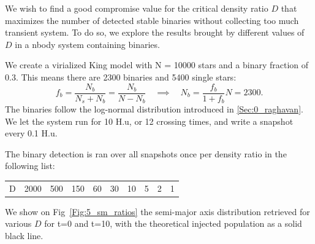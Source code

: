 We wish to find a good compromise value for the critical density ratio $D$ that maximizes the number of detected stable binaries without collecting too much transient system. To do so, we explore the results brought by different values of $D$ in a nbody system containing binaries.

We create a virialized King model with N = 10000 stars and a binary fraction of 0.3. This means there are 2300 binaries and 5400 single stars:
\begin{equation}
f_b = \frac{N_b}{N_s + N_b} = \frac{N_b}{N-N_b} \quad \implies \quad N_b = \frac{f_b}{1+f_b} N = 2300.
\end{equation}
The binaries follow the \cite{Raghavan2010} log-normal distribution introduced in \ref{Sec:0_raghavan}. We let the system run for 10 H.u, or 12 crossing times, and write a snapshot every 0.1 H.u.

The binary detection is ran over all snapshots once per density ratio in the following list:

\begin{center}
\begin{tabular}{l|rrrrrrrrr}
\centering
D  &  2000 & 500 & 150 & 60 & 30 & 10 & 5 & 2 & 1\\ 
\end{tabular}
\end{center}

We show on Fig~\ref{Fig:5_sm_ratios} the semi-major axis distribution retrieved for various $D$ for t=0 and t=10, with the theoretical injected population as a solid black line.



